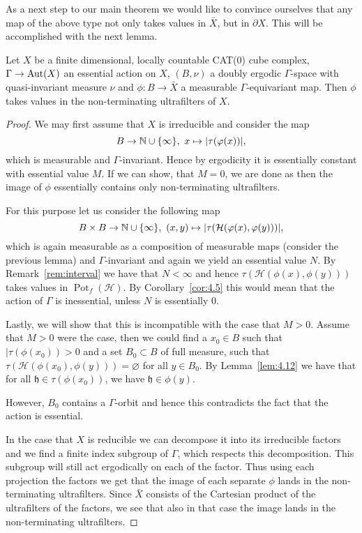 As a next step to our main theorem we would like to convince ourselves that any map of the above type not only takes values in \(\bar X\), but in \(\partial X\). This will be accomplished with the next lemma.

\begin{lemma}[{\cite[Lemma~4.11]{MR3509968}}]
  \label{lem:4.11}
  Let \(X\) be a finite dimensional, locally countable CAT(0) cube complex, \(\Gamma \to \operatorname{Aut}(X)\) an essential action on \(X\), \((B, \nu)\) a doubly ergodic \(\Gamma\)-space with quasi-invariant measure \(\nu\) and \(\phi\colon B \to \bar X\) a measurable \(\Gamma\)-equivariant map. Then \(\phi\) takes values in the non-terminating ultrafilters of \(X\).
\end{lemma}

\begin{proof}
  We may first assume that \(X\) is irreducible and consider the map
  \[
    B \to \mathbb{N} \cup \{\infty\},\ x \mapsto |\tau(\varphi(x))|,
  \]
  which is measurable and \(\Gamma\)-invariant. Hence by ergodicity it is essentially constant with essential value \(M\). If we can show, that \(M = 0\), we are done as then the image of \(\phi\) essentially contains only non-terminating ultrafilters.

  For this purpose let us consider the following map
  \[
    B \times B \to \mathbb{N} \cup \{\infty\},\ (x,y) \mapsto |\tau(\mathcal{H}(\varphi(x), \varphi(y)))|,
  \]
  which is again measurable as a composition of measurable maps (consider the previous lemma) and \(\Gamma\)-invariant and again we yield an essential value \(N\). By Remark~\ref{rem:interval} we have that \(N < \infty\) and hence \(\tau(\mathcal{H}(\phi(x), \phi(y)))\) takes values in \(\operatorname{Pot}_f(\mathcal{H})\). By Corollary~\ref{cor:4.5} this would mean that the action of \(\Gamma\) is inessential, unless \(N\) is essentially 0.

  Lastly, we will show that this is incompatible with the case that \(M > 0\). Assume that \(M > 0\) were the case, then we could find a \(x_0 \in B\) such that \(|\tau(\phi(x_0)) > 0\) and a set \(B_0 \subset B\) of full measure, such that \(\tau(\mathcal{H}(\phi(x_0), \phi(y))) = \varnothing\) for all \(y \in B_0\). By Lemma~\ref{lem:4.12} we have that for all \(\mathfrak{h} \in \tau(\phi(x_0))\), we have \(\mathfrak{h} \in \phi(y)\).

  However, \(B_0\) contains a \(\Gamma\)-orbit and hence this contradicts the fact that the action is essential.
  
  In the case that \(X\) is reducible we can decompose it into its irreducible factors and we find a finite index subgroup of \(\Gamma\), which respects this decomposition. This subgroup will still act ergodically on each of the factor. Thus using each projection the factors we get that the image of each separate \(\phi\) lands in the non-terminating ultrafilters. Since \(\bar X\) consists of the Cartesian product of the ultrafilters of the factors, we see that also in that case the image lands in the non-terminating ultrafilters.
\end{proof}

